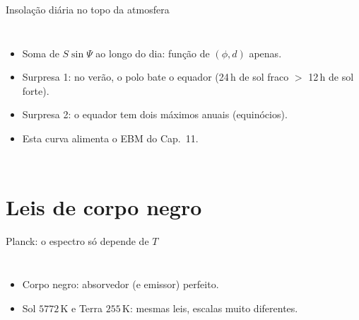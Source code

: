 \documentclass[aspectratio=169,11pt]{beamer}
\begin{document}
\begin{frame}{Insolação diária no topo da atmosfera}
  \begin{columns}
    \begin{itemize}
      \item Soma de $S\sin\Psi$ ao longo do dia: função de $(\phi, d)$
            apenas.
      \item Surpresa 1: no verão, o \alert{polo} bate o equador (24\,h de
            sol fraco $>$ 12\,h de sol forte).
      \item Surpresa 2: o equador tem \alert{dois} máximos anuais
            (equinócios).
      \item Esta curva alimenta o EBM do Cap.~11.
    \end{itemize}
  \end{columns}
\end{frame}

\section{Leis de corpo negro}

\begin{frame}{Planck: o espectro só depende de $T$}
  \begin{columns}
    \vspace{0.4em}
    \begin{itemize}
      \item Corpo negro: absorvedor (e emissor) perfeito.
      \item Sol $5772$\,K e Terra $255$\,K: mesmas leis, escalas muito
            diferentes.
    \end{itemize}
  \end{columns}
\end{frame}
\end{document}
